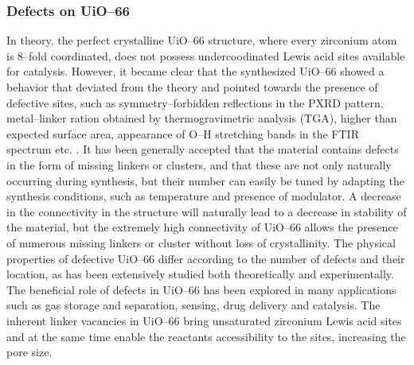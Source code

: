 \subsubsection*{Defects on UiO--66}
In theory, the perfect crystalline UiO--66 structure, where every zirconium atom is 8--fold coordinated, does not possess undercoodinated Lewis acid sites available for catalysis. However, it became clear that the synthesized UiO--66 showed a behavior that deviated from the theory and pointed towards the presence of defective sites, such as symmetry--forbidden reflections in the PXRD pattern, metal--linker ration obtained by thermogravimetric analysis (TGA), higher than expected surface area, appearance of O--H stretching bands in the FTIR spectrum etc. \cite{shearer2014tuned, valenzano2011disclosing}. It has been generally accepted that the material contains defects in the form of missing linkers or clusters, and that these are not only naturally occurring during synthesis, but their number can easily be tuned by adapting the synthesis conditions, such as temperature and presence of modulator\cite{wu2013unusual, shearer2016defect}. A decrease in the connectivity in the structure will naturally lead to a decrease in stability of the material, but the extremely high connectivity of UiO--66 allows the presence of numerous missing linkers or cluster without loss of crystallinity\cite{rogge2016thermodynamic}. The physical properties of defective UiO--66 differ according to the number of defects and their location, as has been extensively studied both theoretically and experimentally. The beneficial role of defects in UiO--66 has been explored in many applications such as gas storage and separation\cite{wu2013unusual, ren2014modulated}, sensing\cite{stassen2016towards}, drug delivery\cite{cunha2013rationale} and catalysis\cite{vermoortele2013synthesis, rogge2017metal}. The inherent linker vacancies in UiO--66 bring unsaturated zirconium Lewis acid sites and at the same time enable the reactants accessibility to the sites, increasing the pore size. 

